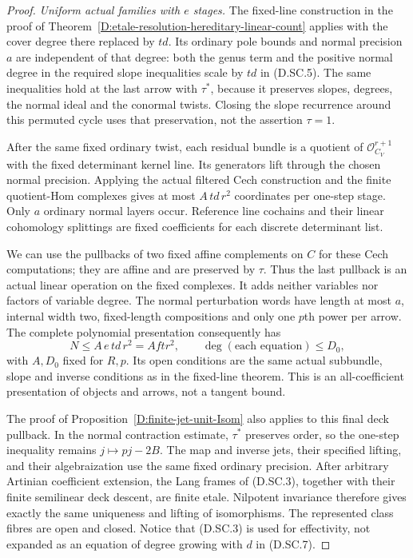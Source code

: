 \begin{proof}
\emph{Uniform actual families with $e$ stages.}
The fixed-line construction in the proof of
Theorem~\ref{D:etale-resolution-hereditary-linear-count}
applies with the cover degree there replaced by $td$.
Its ordinary pole bounds and normal precision $a$ are
independent of that degree: both the genus term and the
positive normal degree in the required slope inequalities
scale by $td$ in (D.SC.5). The same inequalities hold at
the last arrow with $\tau^*$, because it preserves slopes,
degrees, the normal ideal and the conormal twists.
Closing the slope recurrence around this permuted cycle
uses that preservation, not the assertion $\tau=1$.

After the same fixed ordinary twist, each residual bundle
is a quotient of $\mathcal O_{C_V}^{r+1}$ with the fixed
determinant kernel line. Its generators lift through the
chosen normal precision. Applying the actual filtered
Cech construction and the finite quotient-Hom complexes
gives at most $A\,td\,r^2$ coordinates per one-step stage.
Only $a$ ordinary normal layers occur. Reference line
cochains and their linear cohomology splittings are fixed
coefficients for each discrete determinant list.

We can use the pullbacks of two fixed affine complements
on $C$ for these Cech computations; they are affine and
are preserved by $\tau$. Thus the last pullback is an
actual linear operation on the fixed complexes. It adds
neither variables nor factors of variable degree. The
normal perturbation words have length at most $a$,
internal width two, fixed-length compositions and only
one $p$th power per arrow. The complete polynomial
presentation consequently has
\[
     N\leq A\,e\,td\,r^2=A ftr^2,
       \qquad \deg(\text{each equation})\leq D_0,       \tag{D.SC.7}
\]
with $A,D_0$ fixed for $R,p$. Its open conditions are the
same actual subbundle, slope and inverse conditions as
in the fixed-line theorem. This is an all-coefficient
presentation of objects and arrows, not a tangent bound.

The proof of Proposition~\ref{D:finite-jet-unit-Isom}
also applies to this final deck pullback. In the normal
contraction estimate, $\tau^*$ preserves order, so the
one-step inequality remains $j\mapsto pj-2B$. The map
and inverse jets, their specified lifting, and their
algebraization use the same fixed ordinary precision.
After arbitrary Artinian coefficient extension, the
Lang frames of (D.SC.3), together with their finite
semilinear deck descent, are finite etale. Nilpotent
invariance therefore gives exactly the same uniqueness
and lifting of isomorphisms. The represented class
fibres are open and closed. Notice that (D.SC.3) is
used for effectivity, not expanded as an equation of
degree growing with $d$ in (D.SC.7).


\end{proof}

